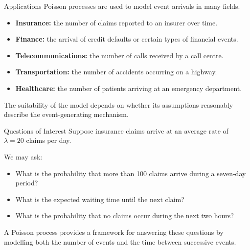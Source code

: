 \documentclass[
  ignorenonframetext,
  aspectratio=169,
]{beamer}
\providecommand{\tightlist}{%
  \setlength{\itemsep}{0pt}\setlength{\parskip}{0pt}}
\begin{document}
\begin{frame}{Applications}
\protect{}\label{applications}
Poisson processes are used to model event arrivals in many fields.

\begin{itemize}
\tightlist
\item
  \textbf{Insurance:} the number of claims reported to an insurer over
  time.
\item
  \textbf{Finance:} the arrival of credit defaults or certain types of
  financial events.
\item
  \textbf{Telecommunications:} the number of calls received by a call
  centre.
\item
  \textbf{Transportation:} the number of accidents occurring on a
  highway.
\item
  \textbf{Healthcare:} the number of patients arriving at an emergency
  department.
\end{itemize}

The suitability of the model depends on whether its assumptions
reasonably describe the event-generating mechanism.
\end{frame}

\begin{frame}{Questions of Interest}
\protect{}\label{questions-of-interest}
Suppose insurance claims arrive at an average rate of \(\lambda=20\)
claims per day.

We may ask:

\begin{itemize}
\tightlist
\item
  What is the probability that more than 100 claims arrive during a
  seven-day period?
\item
  What is the expected waiting time until the next claim?
\item
  What is the probability that no claims occur during the next two
  hours?
\end{itemize}

A Poisson process provides a framework for answering these questions by
modelling both the number of events and the time between successive
events.
\end{frame}
\end{document}
